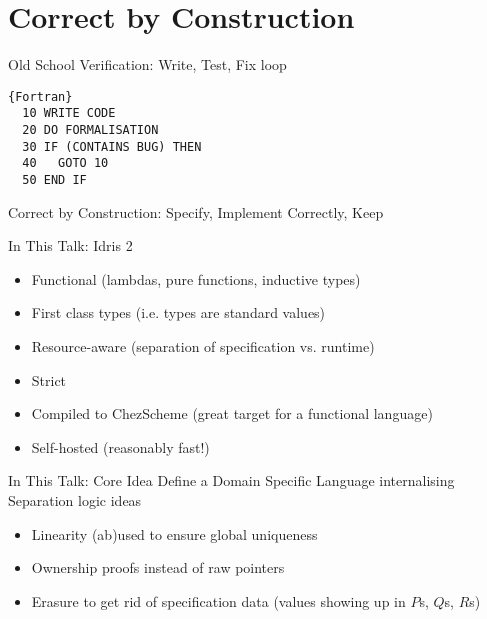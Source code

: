 \section{Correct by Construction}

\newcommand{\mathidris}[1]{{\bf{\mathtt{#1}}}}

\begin{frame}[fragile]{Old School Verification: Write, Test, Fix loop}
\begin{lstlisting}{Fortran}
  10 WRITE CODE
  20 DO FORMALISATION
  30 IF (CONTAINS BUG) THEN
  40   GOTO 10
  50 END IF
\end{lstlisting}
\end{frame}

\begin{frame}{Correct by Construction: Specify, Implement Correctly, Keep}
\end{frame}

\begin{frame}{In This Talk: Idris 2}
  \begin{itemize}
    \item<1-> Functional (lambdas, pure functions, inductive types)
    \item<2-> First class types (i.e. types are standard values)
    \item<3-> Resource-aware (separation of specification vs. runtime)
    \item<5-> Strict
    \item<6-> Compiled to ChezScheme (great target for a functional language)
    \item<7-> Self-hosted (reasonably fast!)
  \end{itemize}


\end{frame}


\begin{frame}{In This Talk: Core Idea}
  Define a Domain Specific Language internalising
  Separation logic ideas

  \vfill
  \begin{itemize}
    \item<2-> Linearity (ab)used to ensure global uniqueness
    \item<3-> Ownership proofs instead of raw pointers
    \item<4-> Erasure to get rid of specification data (values showing up in $P$s, $Q$s, $R$s)
  \end{itemize}

\end{frame}

